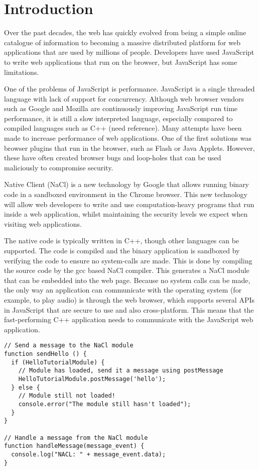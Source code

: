 \chapter{Introduction} 

\label{Chapter1}

Over the past decades, the web has quickly evolved from being a simple online 
catalogue of information to becoming a massive distributed platform for web 
applications that are used by millions of people. Developers have used 
JavaScript to write web applications that run on the browser, but JavaScript 
has some limitations. 

One of the problems of JavaScript is performance. JavaScript is a single 
threaded language with lack of support for concurrency. Although web browser 
vendors such as Google and Mozilla are continuously improving JavaScript run 
time performance, it is still a slow interpreted language, especially compared 
to compiled languages such as C++ (need reference). Many attempts have been 
made to increase performance of web applications. One of the first solutions 
was browser plugins that run in the browser, such as Flash or Java Applets. 
However, these have often created browser bugs and loop-holes that can be used maliciously to compromise security.

Native Client \cite{nacl} (NaCl) is a new technology by Google that allows 
running binary code in a sandboxed environment in the Chrome browser. This new 
technology will allow web developers to write and use computation-heavy 
programs that run inside a web application, whilst maintaining the security 
levels we expect when visiting web applications.

The native code is typically written in C++, though other languages can be 
supported. The code is compiled and the binary application is sandboxed by 
verifying the code to ensure no system-calls are made. This is done by 
compiling the source code by the gcc based NaCl compiler. This generates a NaCl 
module that can be embedded into the web page. Because no system calls can be 
made, the only way an application can communicate with the operating system 
(for example, to play audio) is through the web browser, which supports several 
APIs in JavaScript that are secure to use and also cross-platform. This means 
that the fast-performing C++ application needs to communicate with the 
JavaScript web application.


\begin{lstlisting}
// Send a message to the NaCl module
function sendHello () {
  if (HelloTutorialModule) {
    // Module has loaded, send it a message using postMessage
    HelloTutorialModule.postMessage('hello');
  } else {
    // Module still not loaded!
    console.error("The module still hasn't loaded");
  }
}

// Handle a message from the NaCl module
function handleMessage(message_event) {
  console.log("NACL: " + message_event.data);
}
\end{lstlisting}


